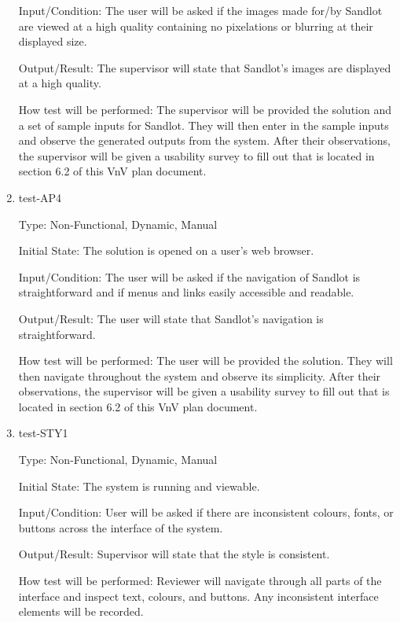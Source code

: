 \documentclass[12pt, titlepage]{article}
\begin{document}
\begin{enumerate}
Input/Condition: The user will be asked if the images made for/by Sandlot are viewed at
a high quality containing no pixelations or blurring at their displayed size.

Output/Result: The supervisor will state that Sandlot's images are displayed at a high
quality.

How test will be performed: The supervisor will be provided the solution and a set of
sample inputs for Sandlot. They will then enter in the sample inputs and observe the
generated outputs from the system. After their observations, the supervisor will be given
a usability survey to fill out that is located in section 6.2 of this VnV plan document.

\item{test-AP4\\}

Type: Non-Functional, Dynamic, Manual
					
Initial State: The solution is opened on a user's web browser.
					
Input/Condition: The user will be asked if the navigation of Sandlot is straightforward 
and if menus and links easily accessible and readable.
					
Output/Result: The user will state that Sandlot's navigation is straightforward.
					
How test will be performed: The user will be provided the solution. They will then 
navigate throughout the system and observe its simplicity. After their observations, 
the supervisor will be given a usability survey to fill out that is located in 
section 6.2 of this VnV plan document.

\item{test-STY1\\}

Type: Non-Functional, Dynamic, Manual
					
Initial State: The system is running and viewable.
					
Input/Condition: User will be asked if there are inconsistent colours,
fonts, or buttons across the interface of the system.
					
Output/Result: Supervisor will state that the style is consistent.
					
How test will be performed: Reviewer will navigate through all parts
of the interface and inspect text, colours, and buttons. Any 
inconsistent interface elements will be recorded. 

\end{enumerate}
\end{document}
